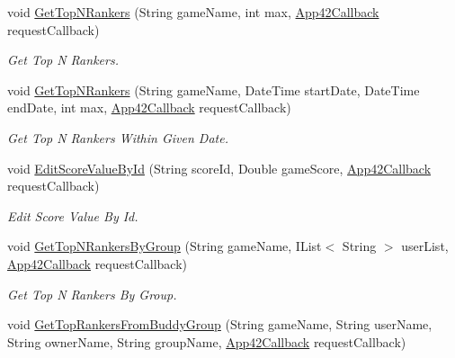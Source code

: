\begin{DoxyCompactItemize}
void \hyperlink{classcom_1_1shephertz_1_1app42_1_1paas_1_1sdk_1_1windows_1_1game_1_1_score_board_service_ad8f7b7e6cd5d9eb5d178394edbe3dfd7}{Get\+Top\+N\+Rankers} (String game\+Name, int max, \hyperlink{interfacecom_1_1shephertz_1_1app42_1_1paas_1_1sdk_1_1windows_1_1_app42_callback}{App42\+Callback} request\+Callback)
\begin{DoxyCompactList}\small\item\em Get Top N Rankers. \end{DoxyCompactList}\item 
void \hyperlink{classcom_1_1shephertz_1_1app42_1_1paas_1_1sdk_1_1windows_1_1game_1_1_score_board_service_a72dda28bc41ff859b8256e62a2e65bb8}{Get\+Top\+N\+Rankers} (String game\+Name, Date\+Time start\+Date, Date\+Time end\+Date, int max, \hyperlink{interfacecom_1_1shephertz_1_1app42_1_1paas_1_1sdk_1_1windows_1_1_app42_callback}{App42\+Callback} request\+Callback)
\begin{DoxyCompactList}\small\item\em Get Top N Rankers Within Given Date. \end{DoxyCompactList}\item 
void \hyperlink{classcom_1_1shephertz_1_1app42_1_1paas_1_1sdk_1_1windows_1_1game_1_1_score_board_service_ad09276459d55ce8b7780eb98f649793e}{Edit\+Score\+Value\+By\+Id} (String score\+Id, Double game\+Score, \hyperlink{interfacecom_1_1shephertz_1_1app42_1_1paas_1_1sdk_1_1windows_1_1_app42_callback}{App42\+Callback} request\+Callback)
\begin{DoxyCompactList}\small\item\em Edit Score Value By Id. \end{DoxyCompactList}\item 
void \hyperlink{classcom_1_1shephertz_1_1app42_1_1paas_1_1sdk_1_1windows_1_1game_1_1_score_board_service_a070f0e6c6f606fc92781a664045d2bdb}{Get\+Top\+N\+Rankers\+By\+Group} (String game\+Name, I\+List$<$ String $>$ user\+List, \hyperlink{interfacecom_1_1shephertz_1_1app42_1_1paas_1_1sdk_1_1windows_1_1_app42_callback}{App42\+Callback} request\+Callback)
\begin{DoxyCompactList}\small\item\em Get Top N Rankers By Group. \end{DoxyCompactList}\item 
void \hyperlink{classcom_1_1shephertz_1_1app42_1_1paas_1_1sdk_1_1windows_1_1game_1_1_score_board_service_adb54fc318e4be508d0fdcc868e376914}{Get\+Top\+Rankers\+From\+Buddy\+Group} (String game\+Name, String user\+Name, String owner\+Name, String group\+Name, \hyperlink{interfacecom_1_1shephertz_1_1app42_1_1paas_1_1sdk_1_1windows_1_1_app42_callback}{App42\+Callback} request\+Callback)

\end{DoxyCompactItemize}
